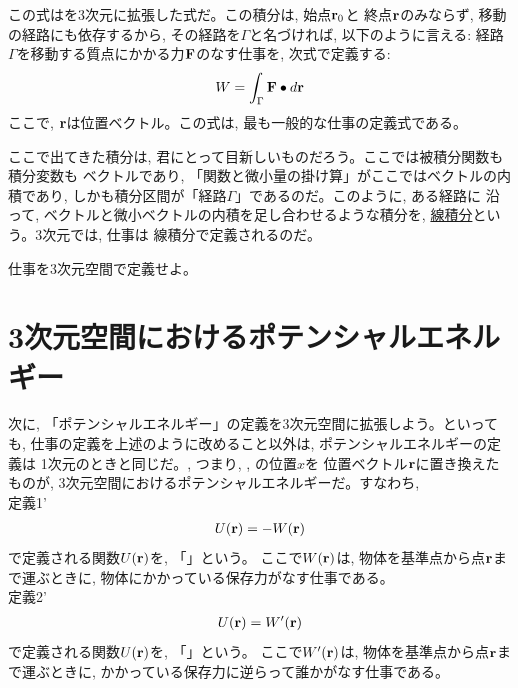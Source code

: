 この式はを3次元に拡張した式だ。この積分は, 始点${\bf r}_0$と
終点${\bf r}$のみならず, 移動の経路にも依存するから, その経路を$\Gamma$と名づければ, 
以下のように言える: 経路$\Gamma$を移動する質点にかかる力${\bf F}$のなす仕事を, 
次式で定義する:
\begin{eqnarray}
W=\int_{\Gamma} {\bf F}\bullet d{\bf r}\label{eq:def_work_3D}
\end{eqnarray} 
ここで, ${\bf r}$は位置ベクトル。この式は, 最も一般的な仕事の定義式である。

ここで出てきた積分は, 君にとって目新しいものだろう。ここでは被積分関数も積分変数も
ベクトルであり, 「関数と微小量の掛け算」がここではベクトルの内積であり, 
しかも積分区間が「経路$\Gamma$」であるのだ。このように, ある経路に
沿って, ベクトルと微小ベクトルの内積を足し合わせるような積分を, 
\underline{線積分}という。3次元では, 仕事は
線積分で定義されるのだ。\mv

\begin{q}\label{q:work_3D}
仕事を3次元空間で定義せよ。
\end{q}
\vspace{0.6cm}


\section{3次元空間におけるポテンシャルエネルギー}

次に, 「ポテンシャルエネルギー」の定義を3次元空間に拡張しよう。といっても, 
仕事の定義を上述のように改めること以外は, ポテンシャルエネルギーの定義は
1次元のときと同じだ。, つまり, 
, の位置$x$を
位置ベクトル${\bf r}$に置き換えたものが, 3次元空間におけるポテンシャルエネルギーだ。すなわち, \\

定義1'
\begin{eqnarray}
U({\bf r})=-W({\bf r})\label{eq:3Dpotential}
\end{eqnarray}
で定義される関数$U({\bf r})$を, 「」という。
ここで$W({\bf r})$は, 物体を基準点から点${\bf r}$まで運ぶときに, 
物体にかかっている保存力がなす仕事である。\\

定義2'
\begin{eqnarray}
U({\bf r})=W'({\bf r})\label{eq:3Dpotential2}
\end{eqnarray}
で定義される関数$U({\bf r})$を, 「」という。
ここで$W'({\bf r})$は, 物体を基準点から点${\bf r}$まで運ぶときに, 
かかっている保存力に逆らって誰かがなす仕事である。\\

